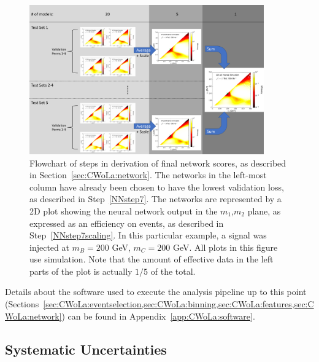 \begin{figure}[t!]
    \centering
    \includegraphics[width=0.9\textwidth]{figures_CWoLa/split_flowchart.pdf}
    \caption{Flowchart of steps in derivation of final network scores, as described in Section~\ref{sec:CWoLa:network}. The networks in the left-most column have already been chosen to have the lowest validation loss, as described in Step~\ref{NNstep7}. The networks are represented by a 2D plot showing the neural network output in the $m_1$,$m_2$ plane, as expressed as an efficiency on events, as described in Step~\ref{NNstep7scaling}. In this particular example, a signal was injected at $m_B=200$ GeV, $m_C=200$ GeV.  All plots in this figure use simulation.  Note that the amount of effective data in the left parts of the plot is actually $1/5$ of the total.}
    \label{fig:CWoLa:flowchart}
\end{figure}


Details about the software used to execute the analysis pipeline up to this point (Sections~\ref{sec:CWoLa:eventselection,sec:CWoLa:binning,sec:CWoLa:features,sec:CWoLa:network}) can be found in Appendix~\ref{app:CWoLa:software}.

\clearpage
\subsection{Systematic Uncertainties}
\label{sec:CWoLa:systs}

